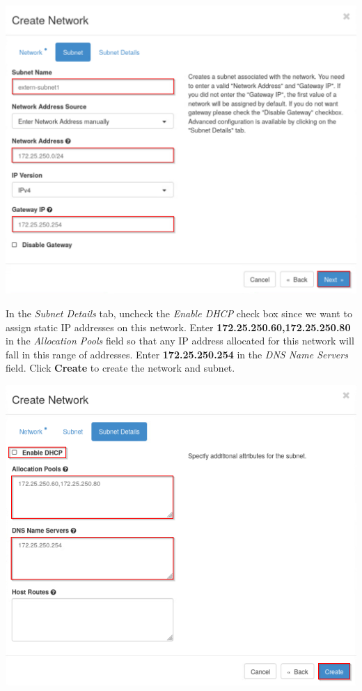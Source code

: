 \documentclass[letterpaper, 12pt]{article}
\begin{document}
\begin{enumerate}
\begin{labstep}
        \begin{center}
            \includegraphics[width=\linewidth]{images/part1/step8.png}
        \end{center}
    \end{labstep}

    \begin{labstep}
        In the \textit{Subnet Details} tab, uncheck the \textit{Enable DHCP} check box since we want to assign static IP addresses on this network.
        Enter \textbf{172.25.250.60,172.25.250.80} in the \textit{Allocation Pools} field so that any IP address allocated for this network will fall in this range of addresses.
        Enter \textbf{172.25.250.254} in the \textit{DNS Name Servers} field.
        Click \textbf{Create} to create the network and subnet.

        \begin{center}
            \includegraphics[width=\linewidth]{images/part1/step9.png}
        \end{center}
    \end{labstep}


\end{enumerate}
\end{document}
